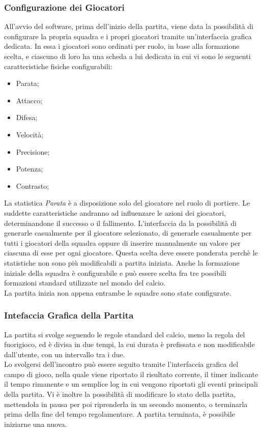 \subsubsection*{Configurazione dei Giocatori}
%
\label{sec:conf_giocatori}
All'avvio del software, prima dell'inizio della partita, viene data la possibilità di configurare la propria squadra e i propri giocatori tramite un'interfaccia grafica dedicata. In essa i giocatori sono ordinati per ruolo, in base alla formazione scelta, e ciascuno di loro ha una scheda a lui dedicata in cui vi sono le seguenti caratteristiche fisiche configurabili:
\begin{itemize}
\item Parata;
\item Attacco;
\item Difesa;
\item Velocità;
\item Precisione;
\item Potenza;
\item Contrasto;
\end{itemize}
\noindent La statistica \emph{Parata} è a disposizione solo del giocatore nel ruolo di portiere. Le suddette caratteristiche andranno ad influenzare le azioni dei giocatori, determinandone il successo o il fallimento. L'interfaccia da la possibilità di generarle casualmente per il giocatore selezionato, di generarle casualmente per tutti i giocatori della squadra oppure di inserire manualmente un valore per ciascuna di esse per ogni giocatore. Questa scelta deve essere ponderata perchè le statistiche non sono più modificabili a partita iniziata. Anche la formazione iniziale della squadra è configurabile e può essere scelta fra tre possibili formazioni standard utilizzate nel mondo del calcio.\\
La partita inizia non appena entrambe le squadre sono state configurate.

\subsubsection*{Intefaccia Grafica della Partita}
%
\label{sec:gui_partita}
La partita si svolge seguendo le regole standard del calcio, meno la regola del fuorigioco, ed è divisa in due tempi, la cui durata è prefissata e non modificabile dall'utente, con un intervallo tra i due.\\
Lo svolgersi dell'incontro può essere seguito tramite l'interfaccia grafica del campo di gioco, nella quale viene riportato il risultato corrente, il timer indicante il tempo rimanente e un semplice log in cui vengono riportati gli eventi principali della partita. Vi è inoltre la possibilità di modificare lo stato della partita, mettendola in pausa per poi riprenderla in un secondo momento, o terminarla prima della fine del tempo regolamentare. A partita terminata, è possibile iniziarne una nuova.\\

